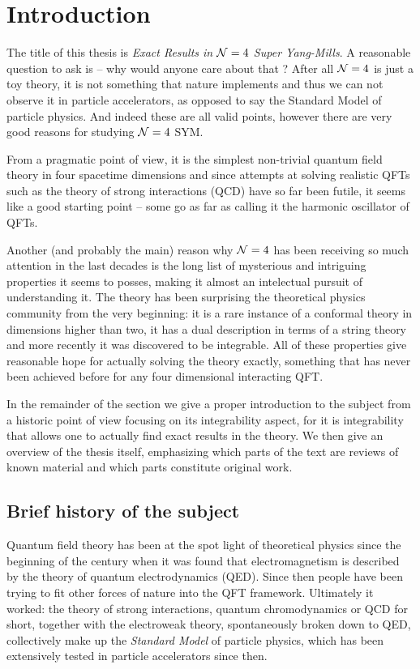 
\section{Introduction}

The title of this thesis is \emph{Exact Results in $\mathcal{N}=4$ Super Yang-Mills}. A reasonable question to ask is -- why would anyone care about that ? 
After all $\mathcal{N}=4$ is just a toy theory, it is not something that nature implements and thus we can not observe it in particle accelerators, as opposed to say the Standard Model of particle physics. 
And indeed these are all valid points, however there are very good reasons for studying $\mathcal{N}=4$ SYM. 

From a pragmatic point of view, it is the simplest non-trivial quantum field theory in four spacetime dimensions and since attempts at solving realistic QFTs such as the theory of strong interactions (QCD) have so far been futile, it seems like a good starting point -- some go as far as calling it the harmonic oscillator of QFTs. 

Another (and probably the main) reason why $\mathcal{N}=4$ has been receiving so much attention in the last decades is the long list of mysterious and intriguing properties it seems to posses, making it almost an intelectual pursuit of understanding it. 
The theory has been surprising the theoretical physics community from the very beginning: it is a rare instance of a conformal theory in dimensions higher than two, it has a dual description in terms of a string theory and more recently it was discovered to be integrable. 
All of these properties give reasonable hope for actually solving the theory exactly, something that has never been achieved before for any four dimensional interacting QFT.

In the remainder of the section we give a proper introduction to the subject from a historic point of view focusing on its integrability aspect, for it is integrability that allows one to actually find exact results in the theory. We then give an overview of the thesis itself, emphasizing which parts of the text are reviews of known material and which parts constitute original work.

\subsection{Brief history of the subject}

Quantum field theory has been at the spot light of theoretical physics since the beginning of the century when it was found that electromagnetism is described by the theory of quantum electrodynamics (QED). Since then people have been trying to fit other forces of nature into the QFT framework. 
Ultimately it worked: the theory of strong interactions, quantum chromodynamics or QCD for short, together with the electroweak theory, spontaneously broken down to QED, collectively make up the \emph{Standard Model} of particle physics, which has been extensively tested in particle accelerators since then. 

